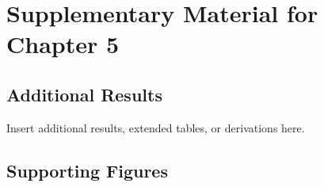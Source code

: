 \chapter{Supplementary Material for Chapter 5}
\label{app:chap5}

\section{Additional Results}
Insert additional results, extended tables, or derivations here.

\section{Supporting Figures}
